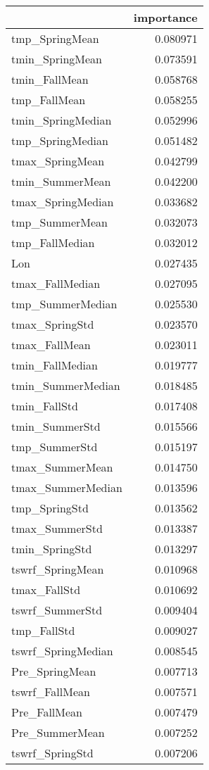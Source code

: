 \begin{tabular}{lr}
\toprule
 & importance \\
\midrule
tmp_SpringMean & 0.080971 \\
tmin_SpringMean & 0.073591 \\
tmin_FallMean & 0.058768 \\
tmp_FallMean & 0.058255 \\
tmin_SpringMedian & 0.052996 \\
tmp_SpringMedian & 0.051482 \\
tmax_SpringMean & 0.042799 \\
tmin_SummerMean & 0.042200 \\
tmax_SpringMedian & 0.033682 \\
tmp_SummerMean & 0.032073 \\
tmp_FallMedian & 0.032012 \\
Lon & 0.027435 \\
tmax_FallMedian & 0.027095 \\
tmp_SummerMedian & 0.025530 \\
tmax_SpringStd & 0.023570 \\
tmax_FallMean & 0.023011 \\
tmin_FallMedian & 0.019777 \\
tmin_SummerMedian & 0.018485 \\
tmin_FallStd & 0.017408 \\
tmin_SummerStd & 0.015566 \\
tmp_SummerStd & 0.015197 \\
tmax_SummerMean & 0.014750 \\
tmax_SummerMedian & 0.013596 \\
tmp_SpringStd & 0.013562 \\
tmax_SummerStd & 0.013387 \\
tmin_SpringStd & 0.013297 \\
tswrf_SpringMean & 0.010968 \\
tmax_FallStd & 0.010692 \\
tswrf_SummerStd & 0.009404 \\
tmp_FallStd & 0.009027 \\
tswrf_SpringMedian & 0.008545 \\
Pre_SpringMean & 0.007713 \\
tswrf_FallMean & 0.007571 \\
Pre_FallMean & 0.007479 \\
Pre_SummerMean & 0.007252 \\
tswrf_SpringStd & 0.007206 \\

\end{tabular}
